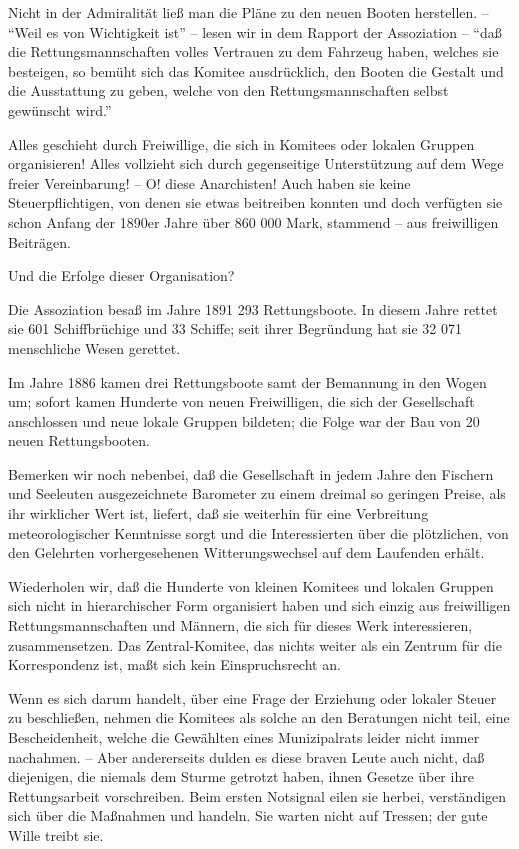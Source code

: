 \documentclass{scrbook}
\begin{document}
Nicht in der Admiralität ließ man die Pläne zu den neuen Booten herstellen. – ``Weil es von Wichtigkeit ist'' – lesen wir in dem Rapport der Assoziation – ``daß die Rettungsmannschaften volles Vertrauen zu dem Fahrzeug haben, welches sie besteigen, so bemüht sich das Komitee ausdrücklich, den Booten die Gestalt und die Ausstattung zu geben, welche von den Rettungsmannschaften selbst gewünscht wird.''

Alles geschieht durch Freiwillige, die sich in Komitees oder lokalen Gruppen organisieren! Alles vollzieht sich durch gegenseitige Unterstützung auf dem Wege freier Vereinbarung! – O! diese Anarchisten! Auch haben sie keine Steuerpflichtigen, von denen sie etwas beitreiben konnten und doch verfügten sie schon Anfang der 1890er Jahre über 860 000 Mark, stammend – aus freiwilligen Beiträgen.

Und die Erfolge dieser Organisation?

Die Assoziation besaß im Jahre 1891 293 Rettungsboote. In diesem Jahre rettet sie 601 Schiffbrüchige und 33 Schiffe; seit ihrer Begründung hat sie 32 071 menschliche Wesen gerettet.

Im Jahre 1886 kamen drei Rettungsboote samt der Bemannung in den Wogen um; sofort kamen Hunderte von neuen Freiwilligen, die sich der Gesellschaft anschlossen und neue lokale Gruppen bildeten; die Folge war der Bau von 20 neuen Rettungsbooten.

Bemerken wir noch nebenbei, daß die Gesellschaft in jedem Jahre den Fischern und Seeleuten ausgezeichnete Barometer zu einem dreimal so geringen Preise, als ihr wirklicher Wert ist, liefert, daß sie weiterhin für eine Verbreitung meteorologischer Kenntnisse sorgt und die Interessierten über die plötzlichen, von den Gelehrten vorhergesehenen Witterungswechsel auf dem Laufenden erhält.

Wiederholen wir, daß die Hunderte von kleinen Komitees und lokalen Gruppen sich nicht in hierarchischer Form organisiert haben und sich einzig aus freiwilligen Rettungsmannschaften und Männern, die sich für dieses Werk interessieren, zusammensetzen. Das Zentral-Komitee, das nichts weiter als ein Zentrum für die Korrespondenz ist, maßt sich kein Einspruchsrecht an.

Wenn es sich darum handelt, über eine Frage der Erziehung oder lokaler Steuer zu beschließen, nehmen die Komitees als solche an den Beratungen nicht teil, eine Bescheidenheit, welche die Gewählten eines Munizipalrats leider nicht immer nachahmen. – Aber andererseits dulden es diese braven Leute auch nicht, daß diejenigen, die niemals dem Sturme getrotzt haben, ihnen Gesetze über ihre Rettungsarbeit vorschreiben. Beim ersten Notsignal eilen sie herbei, verständigen sich über die Maßnahmen und handeln. Sie warten nicht auf Tressen; der gute Wille treibt sie.
\end{document}
